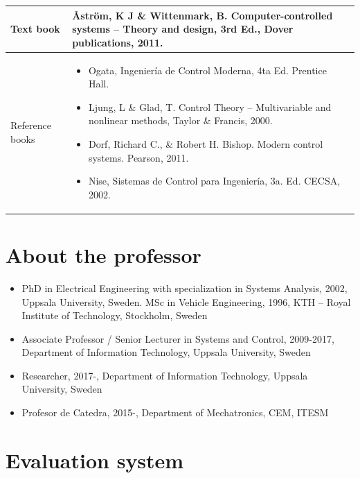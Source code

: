 \documentclass[letter, 10pt]{scrartcl}
\begin{document}
\begin{tabularx}{\linewidth}{|L|X|}
\hline
Text book
& Åström, K J \& Wittenmark, B. Computer-controlled systems – Theory and design, 3rd Ed., Dover publications, 2011.\\
\hline
Reference books
& 
\begin{minipage}[t]{\linewidth}
\begin{itemize}[noitemsep] 
\item Ogata, Ingeniería de Control Moderna, 4ta Ed. Prentice Hall.
\item Ljung, L \& Glad, T. Control Theory – Multivariable and nonlinear methods, Taylor \& Francis, 2000.
\item Dorf, Richard C., \& Robert H. Bishop. Modern control systems. Pearson, 2011.
\item Nise, Sistemas de Control para Ingeniería, 3a. Ed. CECSA, 2002.
\end{itemize}
  \end{minipage} \\\hline
\end{tabularx}

\section*{About the professor}
\begin{itemize}[noitemsep]
\item PhD in Electrical Engineering with specialization in Systems Analysis, 2002, Uppsala University, Sweden. MSc in Vehicle Engineering, 1996, KTH -- Royal Institute of Technology, Stockholm, Sweden
\item Associate Professor / Senior Lecturer in Systems and Control, 2009-2017, Department of Information Technology, Uppsala University, Sweden
\item Researcher, 2017-, Department of Information Technology, Uppsala University, Sweden
\item Profesor de Catedra, 2015-,  Department of Mechatronics, CEM, ITESM
\end{itemize}

\section*{Evaluation system}

\end{document}
